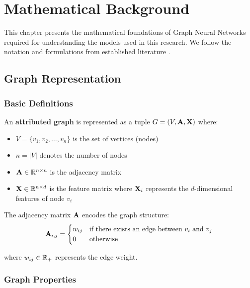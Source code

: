 
\chapter{Mathematical Background}
\label{ch:background}

This chapter presents the mathematical foundations of Graph Neural Networks required for understanding the models used in this research. We follow the notation and formulations from established literature \cite{kipf2017, kazemi2020, scarselli2008}.

\section{Graph Representation}

\subsection{Basic Definitions}

An \textbf{attributed graph} is represented as a tuple $G = (V, \mathbf{A}, \mathbf{X})$ where:

\begin{itemize}
    \item $V = \{v_1, v_2, \ldots, v_n\}$ is the set of vertices (nodes)
    \item $n = |V|$ denotes the number of nodes
    \item $\mathbf{A} \in \mathbb{R}^{n \times n}$ is the adjacency matrix
    \item $\mathbf{X} \in \mathbb{R}^{n \times d}$ is the feature matrix where $\mathbf{X}_i$ represents the $d$-dimensional features of node $v_i$
\end{itemize}

The adjacency matrix $\mathbf{A}$ encodes the graph structure:
\begin{equation}
    \mathbf{A}_{i,j} = \begin{cases}
        w_{ij} & \text{if there exists an edge between } v_i \text{ and } v_j \\
        0 & \text{otherwise}
    \end{cases}
\end{equation}

where $w_{ij} \in \mathbb{R}_+$ represents the edge weight.

\subsection{Graph Properties}

